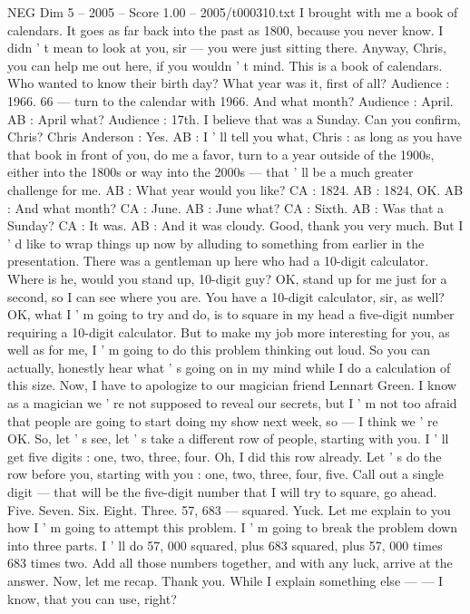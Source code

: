 \begin{textsample}{NEG Dim 5 – 2005 – Score 1.00 – 2005/t000310.txt}
I brought with me a book of calendars.
It goes as far back into the past as 1800, because you never know.
I didn ' t mean to look at you, sir — you were just sitting there.
Anyway, Chris, you can help me out here, if you wouldn ' t mind.
This is a book of calendars.
Who wanted to know their birth day?
What year was it, first of all?
Audience : 1966. 66 — turn to the calendar with 1966.
And what month?
Audience : April.
AB : April what?
Audience : 17th.
I believe that was a Sunday.
Can you confirm, Chris?
Chris Anderson : Yes.
AB : I ' ll tell you what, Chris : as long as you have that book in front of you, do me a favor, turn to a year outside of the 1900s, either into the 1800s or way into the 2000s — that ' ll be a much greater challenge for me.
AB : What year would you like?
CA : 1824.
AB : 1824, OK.
AB : And what month?
CA : June.
AB : June what?
CA : Sixth.
AB : Was that a Sunday?
CA : It was.
AB : And it was cloudy.
Good, thank you very much.
But I ' d like to wrap things up now by alluding to something from earlier in the presentation.
There was a gentleman up here who had a 10-digit calculator.
Where is he, would you stand up, 10-digit guy?
OK, stand up for me just for a second, so I can see where you are.
You have a 10-digit calculator, sir, as well?
OK, what I ' m going to try and do, is to square in my head a five-digit number requiring a 10-digit calculator.
But to make my job more interesting for you, as well as for me, I ' m going to do this problem thinking out loud.
So you can actually, honestly hear what ' s going on in my mind while I do a calculation of this size.
Now, I have to apologize to our magician friend Lennart Green.
I know as a magician we ' re not supposed to reveal our secrets, but I ' m not too afraid that people are going to start doing my show next week, so — I think we ' re OK.
So, let ' s see, let ' s take a different row of people, starting with you.
I ' ll get five digits : one, two, three, four.
Oh, I did this row already.
Let ' s do the row before you, starting with you : one, two, three, four, five.
Call out a single digit — that will be the five-digit number that I will try to square, go ahead.
Five.
Seven.
Six.
Eight.
Three. 57, 683 — squared.
Yuck.
Let me explain to you how I ' m going to attempt this problem.
I ' m going to break the problem down into three parts.
I ' ll do 57, 000 squared, plus 683 squared, plus 57, 000 times 683 times two.
Add all those numbers together, and with any luck, arrive at the answer.
Now, let me recap.
Thank you.
While I explain something else — — I know, that you can use, right?

\end{textsample}
